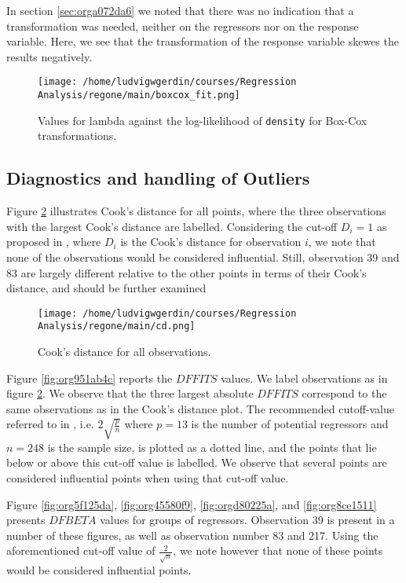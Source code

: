 \documentclass[11pt]{article}
\begin{document}
In section \ref{sec:orga072da6} we noted that there was no indication that a transformation was needed,
neither on the regressors nor on the response variable.
Here, we see that the transformation of the response variable skewes the results negatively.

\begin{figure}[h]
\centering
\texttt{[image: /home/ludvigwgerdin/courses/Regression Analysis/regone/main/boxcox\_fit.png]}
\caption{\label{fig:org7b4ce13}
Values for lambda against the log-likelihood of \texttt{density} for Box-Cox transformations.}
\end{figure}

\subsection{Diagnostics and handling of Outliers}
\label{sec:orgf4a564b}

Figure \ref{fig:org73df39a} illustrates Cook's distance for all points, where the three observations with the largest 
Cook's distance are labelled. Considering the cut-off \(D_i = 1\) as proposed in \cite{Montgomery2012}, 
where \(D_i\) is the Cook's distance for observation \(i\), we note that none of the observations would be 
considered influential. Still, observation 39 and 83 are largely different relative
to the other points in terms of their Cook's distance, and should be further examined

\begin{figure}[h]
\centering
\texttt{[image: /home/ludvigwgerdin/courses/Regression Analysis/regone/main/cd.png]}
\caption{\label{fig:org73df39a}
Cook's distance for all observations.}
\end{figure}

Figure \ref{fig:org951ab4c} reports the \(DFFITS\) values. We label observations as in figure \ref{fig:org73df39a}. We observe 
that the three largest absolute \(DFFITS\) correspond to the same observations as in the Cook's distance plot.
The recommended cutoff-value referred to in \cite{Montgomery2012}, i.e. \(2\sqrt{\frac{p}{n}}\)
where \(p = 13\) is the number of potential regressors and \(n = 248\) is the sample size, is 
plotted as a dotted line, and the points that lie below or above this cut-off value is labelled.
We observe that several points are considered influential points when using that cut-off value.

Figure \ref{fig:org5f125da}, \ref{fig:org45580f9}, \ref{fig:orgd80225a}, and
\ref{fig:org8ce1511} presents \(DFBETA\) values for groups of regressors. Observation 39
is present in a number of these figures, as well as observation number 83 and 217. 
Using the aforementioned cut-off value of \(\frac{2}{\sqrt{n}}\), we note however that none of these points
would be considered influential points.
\end{document}
